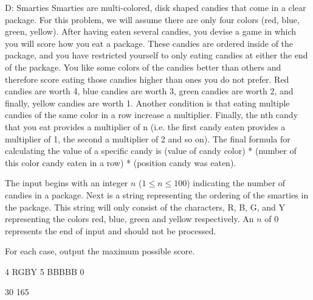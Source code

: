\begin{problem}{D: Smarties}
Smarties are multi-colored, disk shaped candies that come in a clear package. For this problem, we will assume there are only four colors (red, blue, green, yellow). After having eaten several candies, you devise a game in which you will score how you eat a package. These candies are ordered inside of the package, and you have restricted yourself to only eating candies at either the end of the package. You like some colors of the candies better than others and therefore score eating those candies higher than ones you do not prefer. Red candies are worth 4, blue candies are worth 3, green candies are worth 2, and finally, yellow candies are worth 1. Another condition is that eating multiple candies of the same color in a row increase a multiplier. Finally, the nth candy that you eat provides a multiplier of n (i.e. the first candy eaten provides a multiplier of 1, the second a multiplier of 2 and so on). The final formula for calculating the value of a specific candy is (value of candy color) * (number of this color candy eaten in a row) * (position candy was eaten).
\end{problem}

\begin{formalin}
The input begins with an integer $n$ ($1 \leq n \leq 100$) indicating the number of candies in a package. Next is a string representing the ordering of the smarties in the package. This string will only consist of the characters, R, B, G, and Y representing the colors red, blue, green and yellow respectively. An $n$ of 0 represents the end of input and should not be processed.
\end{formalin}

\begin{formalout}
For each case, output the maximum possible score.
\end{formalout}

\begin{datain}
4
RGBY
5
BBBBB
0
\end{datain}

\begin{dataout}
30
165
\end{dataout}

